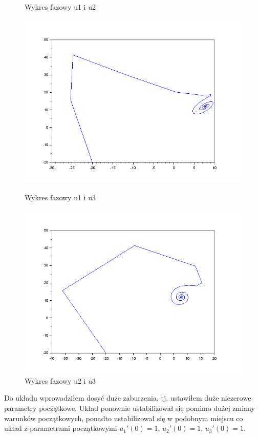 \documentclass[12pt]{article}
\begin{document}
\begin{figure}[H]
\begin{minipage}[b]{0.49\textwidth}
    \caption{Wykres fazowy u1 i u2}
  \end{minipage}
\begin{minipage}[b]{0.49\textwidth}
    \includegraphics[scale=0.4]{./img/7--2011-phase-1-3}
    \caption{Wykres fazowy u1 i u3}
    \end{minipage}
  \hfill
  \begin{minipage}[b]{0.49\textwidth}
    \includegraphics[scale=0.4]{./img/7--2011-phase-2-3}
    \caption{Wykres fazowy u2 i u3}
  \end{minipage}
\end{figure}
Do układu wprowadziłem dosyć duże zaburzenia, tj. ustawiłem duże niezerowe parametry początkowe. Układ ponownie ustabilizował się pomimo dużej zmiany warunków początkowych, ponadto ustabilizował się w podobnym miejscu co układ z parametrami początkowymi $u_1'(0)=1$, $u_2'(0)=1$, $u_3'(0)=1$.
\end{document}
